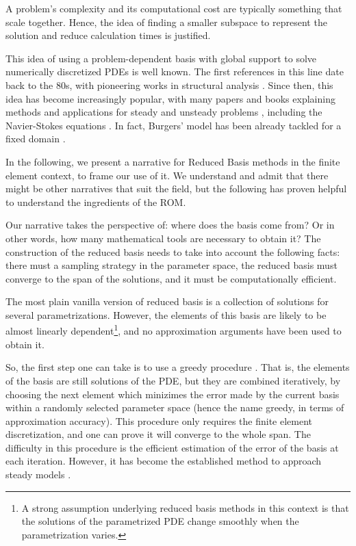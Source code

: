 A problem's complexity and its computational cost
are typically something that scale together.
Hence, the idea of finding a smaller subspace to represent
the solution and reduce calculation times is justified.

This idea of using a problem-dependent basis with global support 
to solve numerically discretized PDEs
is well known.
The first references in this line date back to the 80s, 
with pioneering works in structural analysis \cite{1978firstRBStructuralAnalysis}.
Since then, this idea has become increasingly popular,
with many papers and books explaining methods and applications for steady and unsteady problems
\cite{Rozza2008, 
2005_aPosterioriErrorBoundsReducedBasisApproximationsParametrizedParabolicPde_Grepl,
2009_reducedBasisMethodsAPosterioriErrorEstimatorsHeatTransferProblems_Rozza,
2016_CertifiedReducedBasisMethodsParametrizedPDE_Hesthaven,
Quarteroni2016,
2017_modelReductionAndApproximation,
benner2017_book},
including the Navier-Stokes equations 
\cite{navierStokesReducedBasis}.
In fact, Burgers' model has been already tackled for a fixed domain
\cite{Nguyen2009}.

In the following,
we present a narrative for Reduced Basis methods in the finite element context,
to frame our use of it.
We understand and admit that there might be other narratives that suit the field,
but the following has proven helpful to understand the ingredients of the ROM.

Our narrative takes the perspective of: where does the basis come from?
Or in other words,
how many mathematical tools are necessary to obtain it?
The construction of the reduced basis needs to take into account the following facts:
there must a sampling strategy in the parameter space,
the reduced basis must converge to the span of the solutions,
and it must be computationally efficient.

The most plain vanilla version of reduced basis is 
a collection of solutions for several parametrizations.
However, the elements of this basis are likely to be almost linearly dependent\footnote{
    A strong assumption underlying reduced basis methods in this context
    is that the solutions of the parametrized PDE
    change smoothly when the parametrization varies.
},
and no approximation arguments have been used to obtain it.

So, the first step one can take is to use a greedy procedure
\cite{Buffa2012APC, Veroy2003}.
That is, the elements of the basis are still solutions of the PDE, 
but they are combined iteratively,
by choosing the next element which minizimes 
the error made by the current basis within a randomly selected parameter space
(hence the name greedy, in terms of approximation accuracy).
This procedure only requires the finite element discretization,
and one can prove it will converge to the whole span.
The difficulty in this procedure 
is the efficient estimation of the error
of the basis at each iteration.
However, it has become the established method to approach steady models \cite{Haasdonk2013}.

